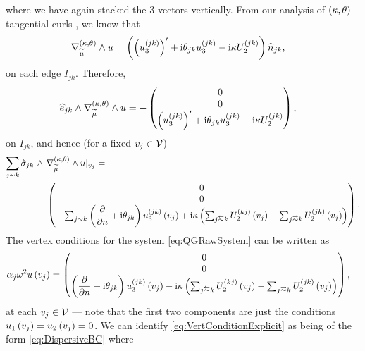 where we have again stacked the 3-vectors vertically.
From our analysis of $\left( \kappa, \theta \right)$-tangential curls , we know that
\begin{align*}
	\nabla_{\widetilde{\mu}}^{\left( \kappa, \theta \right)}\wedge u &= \left(  \left(  u_3^{(jk)}  \right)' + \mathrm{i}\theta_{jk}u_3^{(jk)} - \mathrm{i}\kappa U_2^{(jk)}  \right)\widehat{n}_{jk},
\end{align*}
on each edge $I_{jk}$.
Therefore, 
\begin{align*}
	\widehat{e}_{jk}\wedge\nabla_{\widetilde{\mu}}^{\left( \kappa, \theta \right)}\wedge u &= -
	\begin{pmatrix} 
	0 \\
	0 \\
	\left(  u_3^{(jk)}  \right)' + \mathrm{i}\theta_{jk}u_3^{(jk)} - \mathrm{i}\kappa U_2^{(jk)}
	\end{pmatrix},
\end{align*}
on $I_{jk}$, and hence (for a fixed $v_j\in\mathcal{V}$)
\begin{align*}
	\sum_{j\con k} \hat{\sigma}_{jk} \ \wedge \ &\ktcurl{\dddmes}u\vert_{v_j} = \\ 
	&\begin{pmatrix}
	0 \\
	0 \\	
	- \sum_{j\con k}\bracs{\pdiff{}{n} + \rmi\qm_{jk}}u_3^{(jk)}\bracs{v_j}
	+ \rmi\wavenumber\bracs{ \sum_{j\conRight k} U_2^{(kj)}\bracs{v_j} - \sum_{j\conLeft k} U_2^{(jk)}\bracs{v_j} }
	\end{pmatrix}.
\end{align*}
The vertex conditions for the system \eqref{eq:QGRawSystem} can be written as
\begin{align} \label{eq:VertConditionExplicit}
	\alpha_j\omega^2 u\bracs{v_j} &=
	\begin{pmatrix}
	0 \\
	0 \\	
	\bracs{\pdiff{}{n} + \rmi\qm_{jk}}u_3^{(jk)}\bracs{v_j}
	- \rmi\wavenumber\bracs{ \sum_{j\conRight k} U_2^{(kj)}\bracs{v_j} - \sum_{j\conLeft k} U_2^{(jk)}\bracs{v_j} }
	\end{pmatrix},
\end{align}
at each $v_j\in\mathcal{V}$ --- note that the first two components are just the conditions $u_1\left( v_j \right)=u_2\left( v_j \right)=0$.
We can identify \eqref{eq:VertConditionExplicit} as being of the form \eqref{eq:DispersiveBC} where
